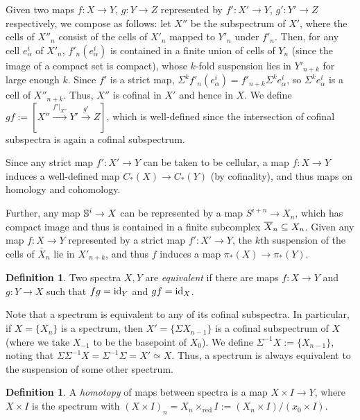 \documentclass[11pt, titlepage]{article} %
\def\bb{\ensuremath\mathbb}
\def\subq{\ensuremath\subseteq}
\def\id{\ensuremath\text{id}}
\numberwithin{equation}{subsection}
\theoremstyle{plain}
\theoremstyle{definition}
\newtheorem{definition}[theorem]{Definition}
\begin{document}
Given two maps \(f : X \to Y\), \(g : Y \to Z\) represented by \(f' : X' \to Y\), \(g' : Y' \to Z\) respectively, we compose as follows: let \(X''\) be the subspectrum of \(X'\), where the cells of \(X''_n\) consist of the cells of \(X'_n\) mapped to \(Y'_n\) under \(f'_n\). Then, for any cell \(e^i_\alpha\) of \(X'_n\), \(f'_n(e^i_\alpha)\) is contained in a finite union of cells of \(Y_n\) (since the image of a compact set is compact), whose \(k\)-fold suspension lies in \(Y'_{n+k}\) for large enough \(k\). Since \(f'\) is a strict map, \(\Sigma^kf'_n(e^i_\alpha)=f'_{n+k}\Sigma^ke^i_\alpha\), so \(\Sigma^ke^i_\alpha\) is a cell of \(X''_{n+k}\). Thus, \(X''\) is cofinal in \(X'\) and hence in \(X\). We define \(gf := [X'' \xrightarrow{f'|_{X''}}Y' \xrightarrow{g'}Z]\), which is well-defined since the intersection of cofinal subspectra is again a cofinal subspectrum. 

Since any strict map \(f' : X' \to Y\) can be taken to be cellular, a map \(f : X \to Y\) induces a well-defined map \(C_*(X)\to C_*(Y)\) (by cofinality), and thus maps on homology and cohomology. 

Further, any map \(\bb{S}^i\to X\) can be represented by a map \(S^{i+n}\to X_n\), which has compact image and thus %
is contained in a finite subcomplex \(\overline X_n \subq X_n\). Given any map \(f : X \to Y\) represented by a strict map \(f' : X' \to Y\), the \(k\)th suspension of the cells of \(\overline X_n\) lie in \(X'_{n+k}\), and thus \(f\) induces a map \(\pi_*(X) \to \pi_*(Y)\). %

\begin{definition}
Two spectra \(X, Y\) are \textit{equivalent} if there are maps \(f : X \to Y\) and \(g : Y \to X\) such that \(fg=\id_{Y}\) and \(gf=\id_X\).
\end{definition}


Note that a spectrum is equivalent to any of its cofinal subspectra. In particular, if \(X=\{X_n\}\) is a spectrum, then \(X'=\{\Sigma X_{n-1}\}\) is a cofinal subspectrum of \(X\) (where we take \(X_{-1}\) to be the basepoint of \(X_0\)). We define \(\Sigma^{-1}X:=\{X_{n-1}\}\), noting that \(\Sigma \Sigma^{-1}X=\Sigma^{-1}\Sigma=X'\simeq X\). Thus, a spectrum is always equivalent to the suspension of some other spectrum.

\begin{definition}
A \textit{homotopy} of maps between spectra is a map \(X\times I \to Y\), where \(X\times I\) is the spectrum with \((X\times I)_n=X_n\times_{\text{red}} I:= (X_n\times I)/(x_0\times I)\).
\end{definition}
\end{document}
